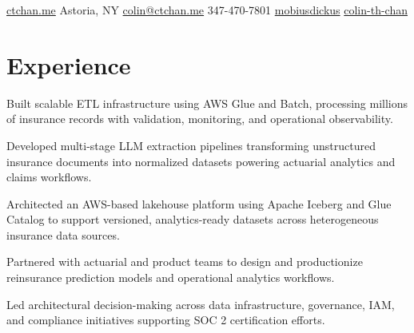 \documentclass[]{plushcv}
\begin{document}
%
%
{
  \contactline
  {\href{https://ctchan.me}{ctchan.me}}
  {Astoria, NY}
  {\href{mailto:colin@ctchan.me}{colin@ctchan.me}}
  {347-470-7801}
  {\href{https://www.github.com/mobiusdickus}{mobiusdickus}}
  {\href{https://www.linkedin.com/in/colin-th-chan/}{colin-th-chan}}
}

%
%

\begin{minipage}[t]{0.70\textwidth} 



\section{Experience}
\vspace{\topsep}
\begin{tightemize}
\item Built scalable ETL infrastructure using AWS Glue and Batch, processing millions of insurance records with validation, monitoring, and operational observability.
\item Developed multi-stage LLM extraction pipelines transforming unstructured insurance documents into normalized datasets powering actuarial analytics and claims workflows.
\item Architected an AWS-based lakehouse platform using Apache Iceberg and Glue Catalog to support versioned, analytics-ready datasets across heterogeneous insurance data sources.
\item Partnered with actuarial and product teams to design and productionize reinsurance prediction models and operational analytics workflows.
\item Led architectural decision-making across data infrastructure, governance, IAM, and compliance initiatives supporting SOC 2 certification efforts.
\end{tightemize}
\sectionsep


\end{minipage}
\end{document}

